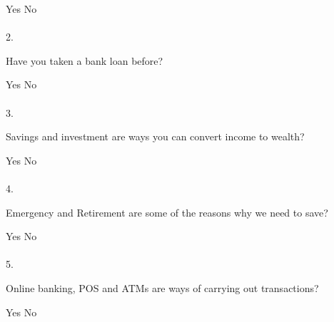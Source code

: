 \documentclass[a5paper]{sdapsclassic}
\begin{document}
\begin{questionnaire}
		\break
		\hspace{25pt}\textcolor{black}{\mycheckbox{}{}}Yes\hspace{8pt}%
		\textcolor{black}{\mycheckbox{}{}}No%
		\\
		\\
		2.\hspace{6pt}\begin{minipage}{29em}Have you taken a bank loan before? \end{minipage}
		\break
		\hspace{25pt}\textcolor{black}{\mycheckbox{}{}}Yes\hspace{8pt}%
		\textcolor{black}{\mycheckbox{}{}}No%
		\\
		\\
		3.\hspace{6pt}\begin{minipage}{40em}Savings and investment are ways you can convert income to wealth? \end{minipage}\break
		\hspace{25pt}\textcolor{black}{\mycheckbox{}{}}Yes\hspace{8pt}%
		\textcolor{black}{\mycheckbox{}{}}No%
		\\
		\\
		4.\hspace{6pt}\begin{minipage}{40em}Emergency and Retirement are some of the reasons why we need to save? \end{minipage}\break
		\hspace{25pt}\textcolor{black}{\mycheckbox{}{}}Yes\hspace{8pt}%
		\textcolor{black}{\mycheckbox{}{}}No%
		\\
		\\
		5.\hspace{6pt}\begin{minipage}{40em}Online banking, POS and ATMs are ways of carrying out transactions? \end{minipage}\break
		\hspace{25pt}\textcolor{black}{\mycheckbox{}{}}Yes\hspace{8pt}%
		\textcolor{black}{\mycheckbox{}{}}No%

\end{questionnaire}
\end{document}
